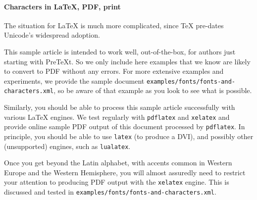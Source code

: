 \documentclass[10pt,]{article}
\theoremstyle{plain}
\theoremstyle{definition}
\theoremstyle{definition}
\theoremstyle{definition}
\theoremstyle{definition}
\theoremstyle{definition}
\theoremstyle{definition}
\numberwithin{equation}{section}
\begin{document}
\paragraph[{Characters in \LaTeX{}, PDF, print}]{Characters in \LaTeX{}, PDF, print}\hypertarget{paragraphs-6}{}
\hypertarget{p-598}{}%
The situation for \LaTeX{} is much more complicated, since \TeX{} pre-dates Unicode's widespread adoption.%
\par
\hypertarget{p-599}{}%
This sample article is intended to work well, out-of-the-box, for authors just starting with PreTeXt.  So we only include here examples that we know are likely to convert to PDF without any errors.  For more extensive examples and experiments, we provide the sample document \lstinline?examples/fonts/fonts-and-characters.xml?, so be aware of that example as you look to see what is possible.%
\par
\hypertarget{p-600}{}%
Similarly, you should be able to process this sample article successfully with various \LaTeX{} engines.  We test regularly with \lstinline?pdflatex? and \lstinline?xelatex? and provide online sample PDF output of this document processed by \lstinline?pdflatex?.  In principle, you should be able to use \lstinline?latex? (to produce a DVI), and possibly other (unsupported) engines, such as \lstinline?lualatex?.%
\par
\hypertarget{p-601}{}%
Once you get beyond the Latin alphabet, with accents common in Western Europe and the Western Hemisphere, you will almost assuredly need to restrict your attention to producing PDF output with the \lstinline?xelatex? engine.  This is discussed and tested in \lstinline?examples/fonts/fonts-and-characters.xml?.%
\typeout{************************************************}
\typeout{************************************************}
\end{document}
